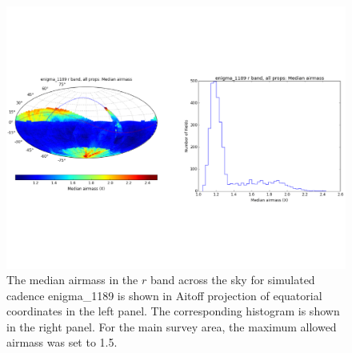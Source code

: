 \documentclass[manuscript]{article}
\begin{document}
\begin{figure}[tbh!]
\vskip -1.3in
\includegraphics[angle=0,width=0.99\hsize,clip]{enigma1189_airmass.pdf}
\vskip -1.3in
\caption{The median airmass in the $r$ band across the sky for simulated cadence
enigma\_1189 is shown in Aitoff 
projection of equatorial coordinates in the left panel. The corresponding histogram is
shown in the right panel. For the main survey area, the maximum allowed airmass 
was set to 1.5. } 
\label{fig:airmassenigma}
\end{figure}
\end{document}
